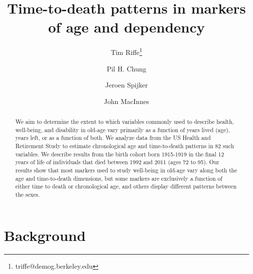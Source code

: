\documentclass{article}
\begin{document}
\title{Time-to-death patterns in markers of age and dependency}

\author[1]{Tim Riffe\thanks{triffe@demog.berkeley.edu}}
\author[1]{Pil H. Chung}
\author[2,3]{Jeroen Spijker}
\author[4]{John MacInnes}

\maketitle

\begin{abstract}
We aim to determine the extent to which variables commonly
used to describe health, well-being, and disability in old-age vary primarily
as a function of years lived (age), years left, or as a function of both. We analyze data from the US Health and Retirement Study to estimate
chronological age and time-to-death patterns in 82 such variables. We describe
results from the birth cohort born 1915-1919 in the final 12 years of life of
individuals that died between 1992 and 2011 (ages 72 to 95). Our results show
that most markers used to study well-being in old-age vary along both the age
and time-to-death dimensions, but some markers are exclusively a function of
either time to death or chronological age, and others display different patterns
between the sexes.
\end{abstract}

\section*{Background}
\end{document}
